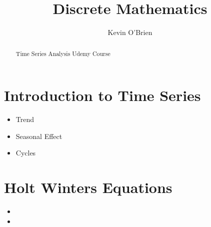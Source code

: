 \documentclass[12pt]{article}
\title{Discrete Mathematics}
\author{Kevin O'Brien}
\begin{document}
\maketitle

\begin{abstract}
Time Series Analysis Udemy Course
\end{abstract}

\section{Introduction to Time Series}
\begin{itemize}
\item Trend
\item Seasonal Effect
\item Cycles
\end{itemize}
\section{Holt Winters Equations}

\begin{itemize}
\item
\item
\end{itemize}

\end{document}
